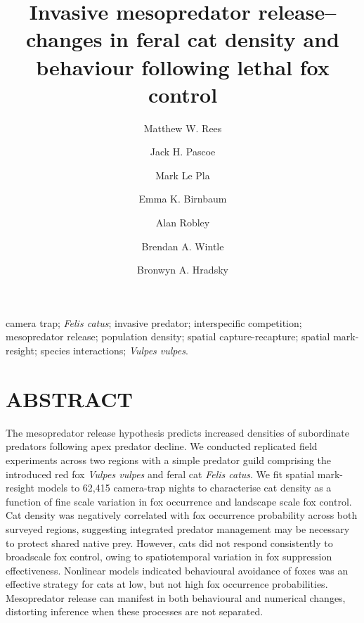 \documentclass[]{elsarticle} %
\begin{document}
\begin{frontmatter}

  \title{Invasive mesopredator release--changes in feral cat density and behaviour following lethal fox control}
    \author[UOM]{Matthew W. Rees}
    \author[CEC]{Jack H. Pascoe}
  
    \author[CEC]{Mark Le Pla}
  
    \author[CEC]{Emma K. Birnbaum}
  
    \author[ARI]{Alan Robley}
  
    \author[UOM]{Brendan A. Wintle}
  
    \author[UOM]{Bronwyn A. Hradsky}
  
      \address[UOM]{Quantitative \& Applied Ecology Group, School of Ecosystem and Forest Science, The University of Melbourne, Parkville, VIC, Australia}
    \address[CEC]{Conservation Ecology Centre, Otway Lighthouse Rd, Cape Otway, VIC, Australia}
    \address[ARI]{Department of Environment, Land, Water and Planning, Arthur Rylah Institute for Environmental Research, Heidelberg, Australia}
  
  \begin{abstract}
  
  \end{abstract}
   \begin{keyword} camera trap; \emph{Felis catus}; invasive predator; interspecific competition; mesopredator release; population density; spatial capture-recapture; spatial mark-resight; species interactions; \emph{Vulpes vulpes}.\end{keyword}
 \end{frontmatter}

\parskip=12pt

\newpage

\hypertarget{abstract}{%
\section*{ABSTRACT}\label{abstract}}

The mesopredator release hypothesis predicts increased densities of subordinate predators following apex predator decline. We conducted replicated field experiments across two regions with a simple predator guild comprising the introduced red fox \emph{Vulpes vulpes} and feral cat \emph{Felis catus}. We fit spatial mark-resight models to 62,415 camera-trap nights to characterise cat density as a function of fine scale variation in fox occurrence and landscape scale fox control. Cat density was negatively correlated with fox occurrence probability across both surveyed regions, suggesting integrated predator management may be necessary to protect shared native prey. However, cats did not respond consistently to broadscale fox control, owing to spatiotemporal variation in fox suppression effectiveness. Nonlinear models indicated behavioural avoidance of foxes was an effective strategy for cats at low, but not high fox occurrence probabilities. Mesopredator release can manifest in both behavioural and numerical changes, distorting inference when these processes are not separated.
\end{document}
